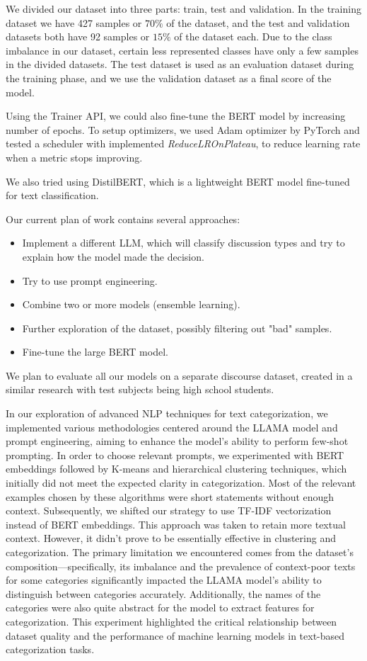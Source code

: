 \documentclass[fleqn,moreauthors,10pt]{ds_report}
\begin{document}
We divided our dataset into three parts: train, test and validation. In the training dataset we have 427 samples or $70\%$ of the dataset, and the test and validation datasets both have 92 samples or $15\%$ of the dataset each. Due to the class imbalance in our dataset, certain less represented classes have only a few samples in the divided datasets. The test dataset is used as an evaluation dataset during the training phase, and we use the validation dataset as a final score of the model.

Using the Trainer API, we could also fine-tune the BERT model by increasing number of epochs. To setup optimizers, we used Adam optimizer by PyTorch and tested a scheduler with implemented \textit{ReduceLROnPlateau}, to reduce learning rate when a metric stops improving.

We also tried using DistilBERT\cite{sanh2020distilbert}, which is a lightweight BERT model fine-tuned for text classification.

Our current plan of work contains several approaches: 
\begin{itemize}[noitemsep]
    \item Implement a different LLM, which will classify discussion types and try to explain how the model made the decision.
    \item Try to use prompt engineering.
    \item Combine two or more models (ensemble learning).
    \item Further exploration of the dataset, possibly filtering out "bad" samples. 
    \item Fine-tune the large BERT model. 
\end{itemize}

We plan to evaluate all our models on a separate discourse dataset, created in a similar research with test subjects being high school students.

In our exploration of advanced NLP techniques for text categorization, we implemented various methodologies centered around the LLAMA model \cite{decapoda-research-llama-7B-hf} and prompt engineering, aiming to enhance the model's ability to perform few-shot prompting. In order to choose relevant prompts, we experimented with BERT embeddings followed by K-means and hierarchical clustering techniques, which initially did not meet the expected clarity in categorization. Most of the relevant examples chosen by these algorithms were short statements without enough context. Subsequently, we shifted our strategy to use TF-IDF vectorization instead of BERT embeddings. This approach was taken to retain more textual context. However, it didn't prove to be essentially effective in clustering and categorization. The primary limitation we encountered comes from the dataset's composition—specifically, its imbalance and the prevalence of context-poor texts for some categories significantly impacted the LLAMA model's ability to distinguish between categories accurately. Additionally, the names of the categories were also quite abstract for the model to extract features for categorization. This experiment highlighted the critical relationship between dataset quality and the performance of machine learning models in text-based categorization tasks. 
\end{document}
